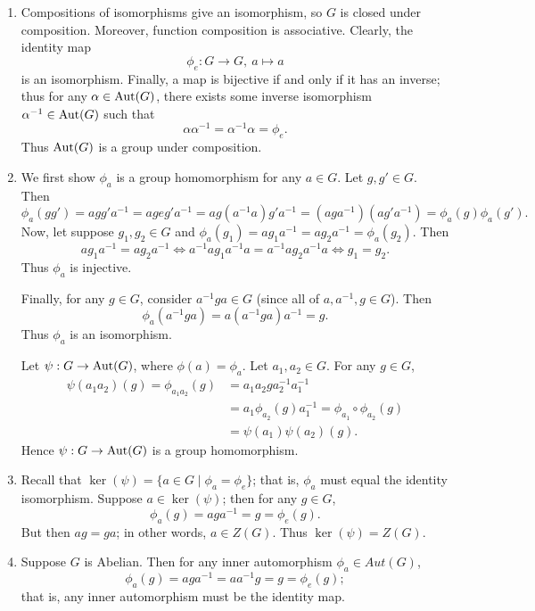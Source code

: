 \documentclass{homework}
\begin{document}
\begin{solution}
  \begin{enumerate}[label=(\alph*)]
    \item Compositions of isomorphisms give an isomorphism, so $G$ is closed under
      composition. Moreover, function composition is associative. Clearly, the identity map \[
        \phi_e:G\longrightarrow G,\ a\longmapsto a
      \] is an isomorphism. Finally, a map is bijective if and only if it has an inverse; thus for
      any $\alpha\in \operatorname{Aut}(G)$, there exists some inverse isomorphism $\alpha^{-1}\in \operatorname{Aut}(G)$ such
      that \[
        \alpha\alpha^{-1}=\alpha^{-1}\alpha=\phi_e
      .\] Thus $\operatorname{Aut}(G)$ is a group under composition.
    \item We first show $\phi_a$ is a group homomorphism for any $a\in G$. Let $g,g'\in G$. Then \[
        \phi_a(gg')=agg'a^{-1}=ageg'a^{-1}=ag(a^{-1}a)g'a^{-1}=(aga^{-1})(ag'a^{-1})=\phi_a(g)\phi_a(g')
      .\] Now, let suppose $g_1,g_2\in G$ and $\phi_a(g_1)=ag_1a^{-1}=ag_2a^{-1}=\phi_a(g_2)$. Then
      \[
        ag_1a^{-1}=ag_2a^{-1}\iff a^{-1}ag_1a^{-1}a=a^{-1}ag_2a^{-1}a\iff g_1=g_2
      .\] Thus $\phi_a$ is injective.

      Finally, for any $g\in G$, consider $a^{-1}ga\in G$ (since all of $a,a^{-1},g\in G$). Then \[
        \phi_a(a^{-1}ga)=a(a^{-1}ga)a^{-1}=g
      .\] Thus $\phi_a$ is an isomorphism.

      Let $\psi:G\to \operatorname{Aut}(G)$, where $\phi(a)=\phi_a$. Let $a_1,a_2\in G$. For any $g\in G$,
      \begin{align*}
        \psi(a_1a_2)(g)=\phi_{a_1a_2}(g)&= a_1a_2ga_2^{-1}a_1^{-1} \\
                                        &= a_1\phi_{a_2}(g)a_1^{-1}=\phi_{a_1}\circ \phi_{a_2}(g)\\
                                        &=\psi(a_1)\psi(a_2)(g)
      .\end{align*} 
      Hence $\psi:G\to \operatorname{Aut}(G)$ is a group homomorphism.
    \item Recall that $\ker{(\psi)}=\{a\in G\mid \phi_a=\phi_e\} $; that is, $\phi_a$
      must equal the identity isomorphism. Suppose $a\in \ker{(\psi)}$; then for any $g\in G$, \[
        \phi_a(g)=aga^{-1}=g=\phi_e(g)
      .\] But then $ag=ga$; in other words, $a\in Z(G)$. Thus $\ker{(\psi)}=Z(G)$.
    \item Suppose $G$ is Abelian. Then for any inner automorphism $\phi_a\in Aut(G)$, \[
        \phi_a(g)=aga^{-1}=aa^{-1}g=g=\phi_e(g)
    ;\] that is, any inner automorphism must be the identity map.


\end{enumerate}
\end{solution}
\end{document}
